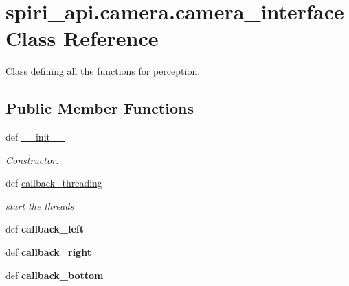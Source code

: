 \hypertarget{classspiri__api_1_1camera_1_1camera__interface}{\section{spiri\-\_\-api.\-camera.\-camera\-\_\-interface \-Class \-Reference}
\label{classspiri__api_1_1camera_1_1camera__interface}
}


\-Class defining all the functions for perception.  


\subsection*{\-Public \-Member \-Functions}
\begin{DoxyCompactItemize}
\item 
\hypertarget{classspiri__api_1_1camera_1_1camera__interface_af1f1cc7fbff0ec085b45dfb0922c691f}{def \hyperlink{classspiri__api_1_1camera_1_1camera__interface_af1f1cc7fbff0ec085b45dfb0922c691f}{\-\_\-\-\_\-init\-\_\-\-\_\-}}\label{classspiri__api_1_1camera_1_1camera__interface_af1f1cc7fbff0ec085b45dfb0922c691f}

\begin{DoxyCompactList}\small\item\em \-Constructor. \end{DoxyCompactList}\item 
def \hyperlink{classspiri__api_1_1camera_1_1camera__interface_aa01883759da88698cfa72cb7988167c7}{callback\-\_\-threading}
\begin{DoxyCompactList}\small\item\em start the threads \end{DoxyCompactList}\item 
\hypertarget{classspiri__api_1_1camera_1_1camera__interface_a35fb0ce651203d6fe53c3db90684ee92}{def {\bfseries callback\-\_\-left}}\label{classspiri__api_1_1camera_1_1camera__interface_a35fb0ce651203d6fe53c3db90684ee92}

\item 
\hypertarget{classspiri__api_1_1camera_1_1camera__interface_aed778f8b52482e9c0f2882335cbdf81d}{def {\bfseries callback\-\_\-right}}\label{classspiri__api_1_1camera_1_1camera__interface_aed778f8b52482e9c0f2882335cbdf81d}

\item 
\hypertarget{classspiri__api_1_1camera_1_1camera__interface_abc6c919fb016eddbb6885f5ca0b7e52b}{def {\bfseries callback\-\_\-bottom}}\label{classspiri__api_1_1camera_1_1camera__interface_abc6c919fb016eddbb6885f5ca0b7e52b}


\end{DoxyCompactItemize}
